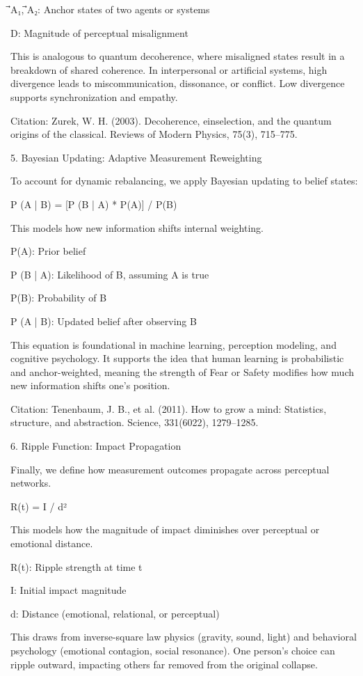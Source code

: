 \documentclass[11pt]{article}
\begin{document}
⃗A₁, ⃗A₂: Anchor states of two agents or systems

D: Magnitude of perceptual misalignment

This is analogous to quantum decoherence, where misaligned states result in a breakdown of shared coherence. In interpersonal or artificial systems, high divergence leads to miscommunication, dissonance, or conflict. Low divergence supports synchronization and empathy.

Citation: Zurek, W. H. (2003). Decoherence, einselection, and the quantum origins of the classical. Reviews of Modern Physics, 75(3), 715–775.

5. Bayesian Updating: Adaptive Measurement Reweighting

To account for dynamic rebalancing, we apply Bayesian updating to belief states:

P (A | B) = [P (B | A) * P(A)] / P(B)

This models how new information shifts internal weighting.

P(A): Prior belief

P (B | A): Likelihood of B, assuming A is true

P(B): Probability of B

P (A | B): Updated belief after observing B

This equation is foundational in machine learning, perception modeling, and cognitive psychology. It supports the idea that human learning is probabilistic and anchor-weighted, meaning the strength of Fear or Safety modifies how much new information shifts one’s position.

Citation: Tenenbaum, J. B., et al. (2011). How to grow a mind: Statistics, structure, and abstraction. Science, 331(6022), 1279–1285.

6. Ripple Function: Impact Propagation

Finally, we define how measurement outcomes propagate across perceptual networks.

R(t) = I / d²

This models how the magnitude of impact diminishes over perceptual or emotional distance.

R(t): Ripple strength at time t

I: Initial impact magnitude

d: Distance (emotional, relational, or perceptual)

This draws from inverse-square law physics (gravity, sound, light) and behavioral psychology (emotional contagion, social resonance). One person’s choice can ripple outward, impacting others far removed from the original collapse.
\end{document}
